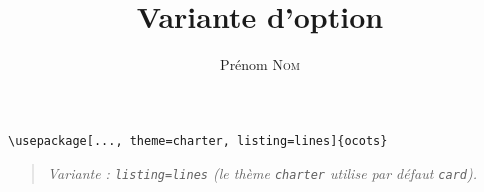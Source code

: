 \documentclass[11pt]{ocots-book}
\title{Variante d'option}
\author{Prénom \textsc{Nom}}
\newcommand{\ocotsvariantnote}[1]{\begin{quote}\itshape Variante : #1\end{quote}}
\begin{document}
\maketitle

\begin{lstlisting}
\usepackage[..., theme=charter, listing=lines]{ocots}
\end{lstlisting}
\ocotsvariantnote{\texttt{listing=lines} (le th\`eme \texttt{charter} utilise par d\'efaut \texttt{card}).}

\end{document}
